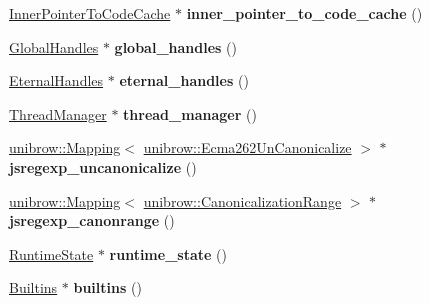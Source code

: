 \begin{DoxyCompactItemize}
\mbox{\hyperlink{classv8_1_1internal_1_1InnerPointerToCodeCache}{Inner\+Pointer\+To\+Code\+Cache}} $\ast$ {\bfseries inner\+\_\+pointer\+\_\+to\+\_\+code\+\_\+cache} ()
\item 
\mbox{\label{classv8_1_1internal_1_1Isolate_af83dc55d6b6ac38086fa181d110eeba6}} 
\mbox{\hyperlink{classv8_1_1internal_1_1GlobalHandles}{Global\+Handles}} $\ast$ {\bfseries global\+\_\+handles} ()
\item 
\mbox{\label{classv8_1_1internal_1_1Isolate_af528177ab1bb312657f39ee64bb19518}} 
\mbox{\hyperlink{classv8_1_1internal_1_1EternalHandles}{Eternal\+Handles}} $\ast$ {\bfseries eternal\+\_\+handles} ()
\item 
\mbox{\label{classv8_1_1internal_1_1Isolate_aabc2be46fe8930ab6f44538d1eca456b}} 
\mbox{\hyperlink{classv8_1_1internal_1_1ThreadManager}{Thread\+Manager}} $\ast$ {\bfseries thread\+\_\+manager} ()
\item 
\mbox{\label{classv8_1_1internal_1_1Isolate_abb16bd94a89f5b53f63733cd88268dd1}} 
\mbox{\hyperlink{classunibrow_1_1Mapping}{unibrow\+::\+Mapping}}$<$ \mbox{\hyperlink{structunibrow_1_1Ecma262UnCanonicalize}{unibrow\+::\+Ecma262\+Un\+Canonicalize}} $>$ $\ast$ {\bfseries jsregexp\+\_\+uncanonicalize} ()
\item 
\mbox{\label{classv8_1_1internal_1_1Isolate_a3c7039fefe33dda66e6029c8d46cdef1}} 
\mbox{\hyperlink{classunibrow_1_1Mapping}{unibrow\+::\+Mapping}}$<$ \mbox{\hyperlink{structunibrow_1_1CanonicalizationRange}{unibrow\+::\+Canonicalization\+Range}} $>$ $\ast$ {\bfseries jsregexp\+\_\+canonrange} ()
\item 
\mbox{\label{classv8_1_1internal_1_1Isolate_a22f364d364fb4d61f68aa25f06951305}} 
\mbox{\hyperlink{classv8_1_1internal_1_1RuntimeState}{Runtime\+State}} $\ast$ {\bfseries runtime\+\_\+state} ()
\item 
\mbox{\label{classv8_1_1internal_1_1Isolate_a6cb0edf57f829ea37a9a48a3e6bc007d}} 
\mbox{\hyperlink{classv8_1_1internal_1_1Builtins}{Builtins}} $\ast$ {\bfseries builtins} ()
\item 

\end{DoxyCompactItemize}

